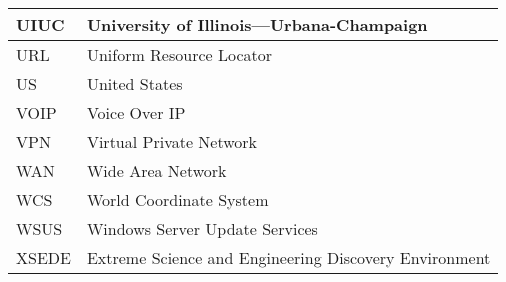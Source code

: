 \begin{longtable}{|l|p{}|}
UIUC & University of Illinois—Urbana-Champaign \\\hline
URL & Uniform Resource Locator \\\hline
US & United States \\\hline
VOIP & Voice Over IP \\\hline
VPN & Virtual Private Network \\\hline
WAN & Wide Area Network \\\hline
WCS & World Coordinate System \\\hline
WSUS & Windows Server Update Services \\\hline
XSEDE & Extreme Science and Engineering Discovery Environment \\\hline
\end{longtable}
